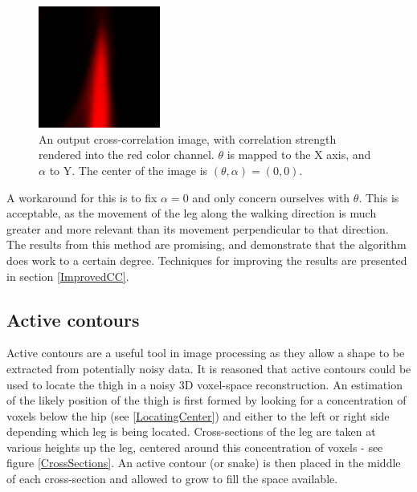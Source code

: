 \begin{figure}[tb]
	\vspace{-10pt}
	\centering
	\includegraphics[height=4cm]{../interim/parameterspace.png}
	\caption{An output cross-correlation image, with correlation strength rendered into the red color channel.
		$\theta$ is mapped to the X axis, and $\alpha$ to Y.
		The center of the image is $(\theta, \alpha) = (0,0)$.}
	\label{ParameterSpace}
\end{figure}

A workaround for this is to fix $\alpha = 0$ and only concern ourselves with $\theta$.
This is acceptable, as the movement of the leg along the walking direction is much greater and more relevant \cite{GaitBook} than its movement perpendicular to that direction.
The results from this method are promising, and demonstrate that the algorithm does work to a certain degree.
Techniques for improving the results are presented in section \ref{ImprovedCC}.


\subsection{Active contours}

Active contours are a useful tool in image processing as they allow a shape to be extracted from potentially noisy data.
It is reasoned that active contours could be used to locate the thigh in a noisy 3D voxel-space reconstruction.
An estimation of the likely position of the thigh is first formed by looking for a concentration of voxels below the hip
(see \ref{LocatingCenter}) and either to the left or right side depending which leg is being located.
Cross-sections of the leg are taken at various heights up the leg, centered around this concentration of voxels - see figure \ref{CrossSections}.
An active contour (or snake) is then placed in the middle of each cross-section and allowed to grow to fill the space available.

